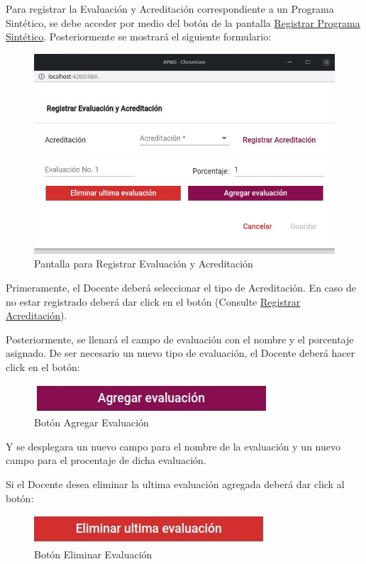 Para registrar la Evaluación y Acreditación correspondiente a un Programa Sintético, se debe acceder por medio del botón  de la pantalla \hyperlink{RegistrarPS}{Registrar Programa Sintético}. Posteriormente se mostrará el siguiente formulario:


\begin{figure}[!h]
    \centering
    \hypertarget{RegistrarEC}{\includegraphics[width=0.5\linewidth]{images/SP6/8.jpeg}}
    \caption{Pantalla para Registrar Evaluación y Acreditación}
\end{figure}

Primeramente, el Docente deberá seleccionar el tipo de Acreditación. En caso de no estar registrado deberá dar click en el botón (Consulte \hyperlink{RegAcre}{Registrar Acreditación}).

Posteriormente, se llenará el campo de evaluación con el nombre y el porcentaje asignado. De ser necesario un nuevo tipo de evaluación, el Docente deberá hacer click en el botón:

\begin{figure}[!h]
    \centering
    \includegraphics[width=0.3\linewidth]{images/SP6/BotonEval.jpeg}
    \caption{Botón Agregar Evaluación}
\end{figure}

Y se desplegara un nuevo campo para el nombre de la evaluación y un nuevo campo para el procentaje de dicha evaluación.

Si el Docente desea eliminar la ultima evaluación agregada deberá dar click al botón:


\begin{figure}[!h]
    \centering
    \includegraphics[width=0.3\linewidth]{images/SP6/BotonEliEval.jpeg}
    \caption{Botón Eliminar Evaluación}
\end{figure}


